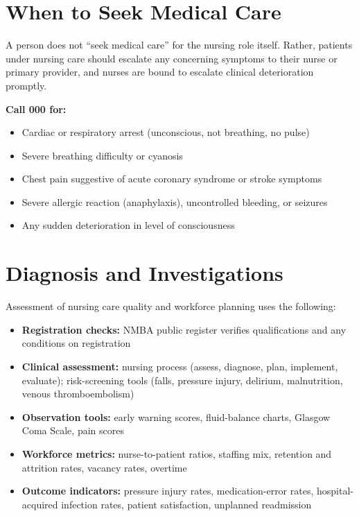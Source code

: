 \section*{When to Seek Medical Care}
A person does not ``seek medical care'' for the nursing role itself. Rather, patients under nursing care should escalate any concerning symptoms to their nurse or primary provider, and nurses are bound to escalate clinical deterioration promptly.

\textbf{Call 000 for:}
\begin{itemize}
    \item Cardiac or respiratory arrest (unconscious, not breathing, no pulse)
    \item Severe breathing difficulty or cyanosis
    \item Chest pain suggestive of acute coronary syndrome or stroke symptoms
    \item Severe allergic reaction (anaphylaxis), uncontrolled bleeding, or seizures
    \item Any sudden deterioration in level of consciousness
\end{itemize}

\section*{Diagnosis and Investigations}
Assessment of nursing care quality and workforce planning uses the following:
\begin{itemize}
    \item \textbf{Registration checks:} NMBA public register verifies qualifications and any conditions on registration
    \item \textbf{Clinical assessment:} nursing process (assess, diagnose, plan, implement, evaluate); risk-screening tools (falls, pressure injury, delirium, malnutrition, venous thromboembolism)
    \item \textbf{Observation tools:} early warning scores, fluid-balance charts, Glasgow Coma Scale, pain scores
    \item \textbf{Workforce metrics:} nurse-to-patient ratios, staffing mix, retention and attrition rates, vacancy rates, overtime
    \item \textbf{Outcome indicators:} pressure injury rates, medication-error rates, hospital-acquired infection rates, patient satisfaction, unplanned readmission
\end{itemize}

